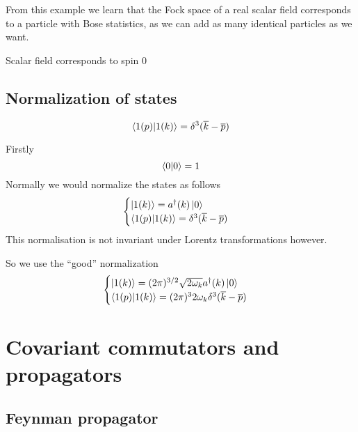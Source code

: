 From this example we learn that the Fock space of a real scalar field corresponds to a particle with Bose statistics, as we can add as many identical particles as we want.
\begin{eigenschap}
Scalar field corresponds to spin 0
\end{eigenschap}

\subsection{Normalization of states}
\[ \braket{1(p)}{1(k)} = \delta^3(\overline{k}- \overline{p}) \]


Firstly
\[\braket{0}{0} = 1\]
Normally we would normalize the states as follows
\[ \begin{cases}
\ket{1(k)} = a^\dagger(k)\ket{0} \\
\braket{1(p)}{1(k)} = \delta^3(\overline{k}- \overline{p})
\end{cases}\]
This normalisation is not invariant under Lorentz transformations however.

So we use the ``good'' normalization
\[ \begin{cases}
\ket{1(k)} = (2\pi)^{3/2}\sqrt{2\omega_k}a^\dagger(k)\ket{0} \\
\braket{1(p)}{1(k)} = (2\pi)^{3}2\omega_k\delta^3(\overline{k}- \overline{p})
\end{cases} \]

\section{Covariant commutators and propagators}
\subsection{Feynman propagator}


